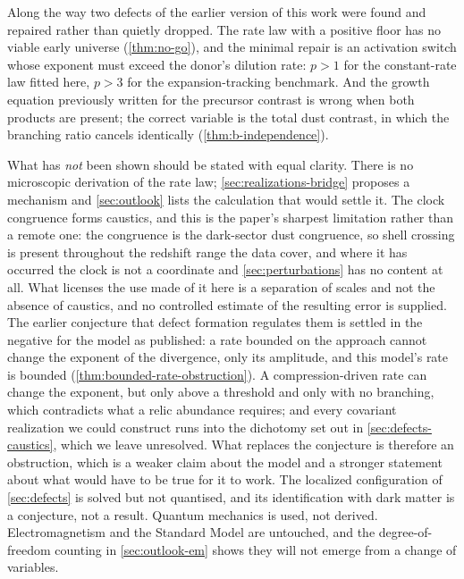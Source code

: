 Along the way two defects of the earlier version of this work were found and
repaired rather than quietly dropped. The rate law with a positive floor has no
viable early universe (\cref{thm:no-go}), and the minimal repair is an
activation switch whose exponent must exceed the donor's dilution rate: $p>1$
for the constant-rate law fitted here, $p>3$ for the expansion-tracking
benchmark. And the growth equation previously
written for the precursor contrast is wrong when both products are present; the
correct variable is the total dust contrast, in which the branching ratio
cancels identically (\cref{thm:b-independence}).

What has \emph{not} been shown should be stated with equal clarity. There is no
microscopic derivation of the rate law; \cref{sec:realizations-bridge} proposes
a mechanism and \cref{sec:outlook} lists the calculation that would settle it.
The clock congruence forms caustics, and this is the paper's sharpest
limitation rather than a remote one: the congruence is the dark-sector dust
congruence, so shell crossing is present throughout the redshift range the data
cover, and where it has occurred the clock is not a coordinate and
\cref{sec:perturbations} has no content at all. What licenses the use made of
it here is a separation of scales and not the absence of caustics, and no
controlled estimate of the resulting error is supplied. The earlier conjecture
that defect formation regulates them is settled in the negative for the model
as published: a rate bounded on the approach cannot change the exponent of the
divergence, only its amplitude, and this model's rate is bounded
(\cref{thm:bounded-rate-obstruction}). A compression-driven rate can change the
exponent, but only above a threshold and only with no branching, which
contradicts what a relic abundance requires; and every covariant realization we
could construct runs into the dichotomy set out in
\cref{sec:defects-caustics}, which we leave unresolved. What replaces the conjecture is therefore an
obstruction, which is a weaker claim about the model and a stronger statement
about what would have to be true for it to work. The localized configuration
of \cref{sec:defects} is solved but not quantised, and its identification with
dark matter is a conjecture, not a result. Quantum mechanics is used, not
derived. Electromagnetism and the Standard Model are untouched, and the
degree-of-freedom counting in \cref{sec:outlook-em} shows they will not emerge
from a change of variables.

